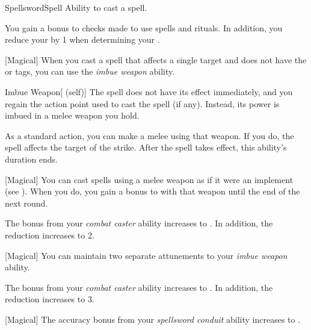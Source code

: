     \begin{feat}{Spellsword}{Spell}
        \featpre Ability to cast a spell.

         You gain a  bonus to  checks made to use spells and rituals.
        In addition, you reduce your  by 1 when determining your .

        [Magical] When you cast a spell that affects a single target and does not have the  or  tags,
            you can use the \textit{imbue weapon} ability.
        \begin{attuneability}{Imbue Weapon}[ (self)]
            The spell does not have its effect immediately, and you regain the action point used to cast the spell (if any).
            Instead, its power is imbued in a melee weapon you hold.

            As a standard action, you can make a melee  using that weapon.
            If you do, the spell affects the target of the strike.
            After the spell takes effect, this ability's duration ends.
        \end{attuneability}

        [Magical] You can cast spells using a melee weapon as if it were an implement (see ).
        When you do, you gain a  bonus to  with that weapon until the end of the next round.

         The  bonus from your \textit{combat caster} ability increases to .
        In addition, the  reduction increases to 2.

        [Magical] You can maintain two separate attunements to your \textit{imbue weapon} ability.

         The  bonus from your \textit{combat caster} ability increases to .
        In addition, the  reduction increases to 3.

        [Magical] The accuracy bonus from your \textit{spellsword conduit} ability increases to .
    \end{feat}

